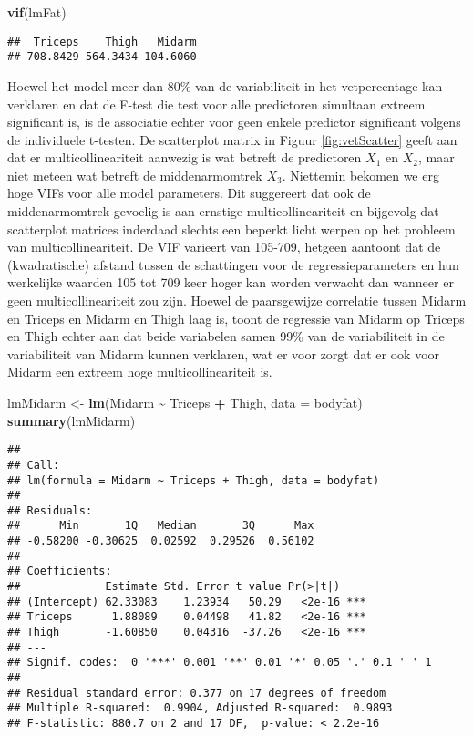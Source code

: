 \documentclass[
  12pt,dutch,coursenotes]{book}
\newenvironment{Shaded}{\begin{snugshade}}{\end{snugshade}}
\newcommand{\DataTypeTok}[1]{\textcolor[rgb]{0.13,0.29,0.53}{#1}}
\newcommand{\KeywordTok}[1]{\textcolor[rgb]{0.13,0.29,0.53}{\textbf{#1}}}
\newcommand{\NormalTok}[1]{#1}
\newcommand{\OperatorTok}[1]{\textcolor[rgb]{0.81,0.36,0.00}{\textbf{#1}}}
\newcommand{\StringTok}[1]{\textcolor[rgb]{0.31,0.60,0.02}{#1}}
\theoremstyle{definition}
\theoremstyle{definition}
\theoremstyle{definition}
\theoremstyle{remark}
\begin{document}
\begin{Shaded}
\begin{Highlighting}[]
\KeywordTok{vif}\NormalTok{(lmFat)}
\end{Highlighting}
\end{Shaded}

\begin{verbatim}
##  Triceps    Thigh   Midarm 
## 708.8429 564.3434 104.6060
\end{verbatim}

Hoewel het model meer dan 80\% van de variabiliteit in het vetpercentage kan verklaren en dat de F-test die test voor alle predictoren simultaan extreem significant is, is de associatie echter voor geen enkele predictor significant volgens de individuele t-testen.
De scatterplot matrix in Figuur \ref{fig:vetScatter} geeft aan dat er multicollineariteit aanwezig is wat betreft de predictoren \(X_1\) en \(X_2\), maar niet meteen wat betreft de middenarmomtrek \(X_3\). Niettemin bekomen we erg hoge VIFs voor alle model parameters.
Dit suggereert dat ook de middenarmomtrek gevoelig is aan ernstige multicollineariteit en bijgevolg dat scatterplot matrices inderdaad slechts een beperkt licht werpen op het probleem van multicollineariteit.
De VIF varieert van 105-709, hetgeen aantoont dat de (kwadratische) afstand tussen de schattingen voor de regressieparameters en hun werkelijke waarden 105 tot 709 keer hoger kan worden verwacht dan wanneer er geen multicollineariteit zou zijn.
Hoewel de paarsgewijze correlatie tussen Midarm en Triceps en Midarm en Thigh laag is, toont de regressie van Midarm op Triceps en Thigh echter aan dat beide variabelen samen 99\% van de variabiliteit in de variabiliteit van Midarm kunnen verklaren, wat er voor zorgt dat er ook voor Midarm een extreem hoge multicollineariteit is.

\begin{Shaded}
\begin{Highlighting}[]
\NormalTok{lmMidarm \textless{}{-}}\StringTok{ }\KeywordTok{lm}\NormalTok{(Midarm }\OperatorTok{\textasciitilde{}}\StringTok{ }\NormalTok{Triceps }\OperatorTok{+}\StringTok{ }\NormalTok{Thigh, }\DataTypeTok{data =}\NormalTok{ bodyfat)}
\KeywordTok{summary}\NormalTok{(lmMidarm)}
\end{Highlighting}
\end{Shaded}

\begin{verbatim}
## 
## Call:
## lm(formula = Midarm ~ Triceps + Thigh, data = bodyfat)
## 
## Residuals:
##      Min       1Q   Median       3Q      Max 
## -0.58200 -0.30625  0.02592  0.29526  0.56102 
## 
## Coefficients:
##             Estimate Std. Error t value Pr(>|t|)    
## (Intercept) 62.33083    1.23934   50.29   <2e-16 ***
## Triceps      1.88089    0.04498   41.82   <2e-16 ***
## Thigh       -1.60850    0.04316  -37.26   <2e-16 ***
## ---
## Signif. codes:  0 '***' 0.001 '**' 0.01 '*' 0.05 '.' 0.1 ' ' 1
## 
## Residual standard error: 0.377 on 17 degrees of freedom
## Multiple R-squared:  0.9904, Adjusted R-squared:  0.9893 
## F-statistic: 880.7 on 2 and 17 DF,  p-value: < 2.2e-16
\end{verbatim}
\end{document}
